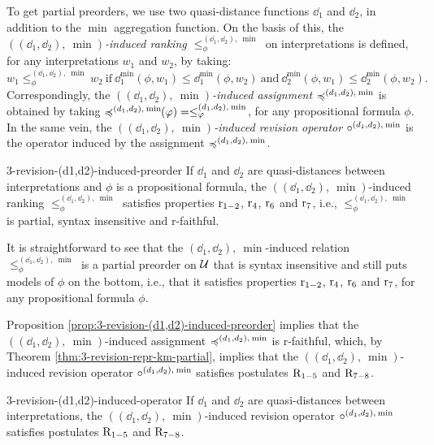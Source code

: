 To get partial preorders, we use two quasi-distance functions $\dd_{1}$ and $\dd_{2}$,
in addition to the $\min$ aggregation function.
On the basis of this, the \emph{$((\dd_{1},\dd_{2}),\:\min)$-induced ranking $\le^{(\dd_{1},\dd_{2}),\:\min}_\phi$}
on interpretations
is defined, for any interpretations $w_1$ and $w_2$, by taking:
$$
	w_1\le^{(\dd_{1},\dd_{2}),\:\min}_\phi w_2~
	\text{if}~\dd_{1}^{\min}(\phi,w_1)\le\dd_{1}^{\min}(\phi,w_2)~\text{and}~\dd_{2}^{\min}(\phi,w_1)\le\dd_{2}^{\min}(\phi,w_2).
$$
Correspondingly, 
the \emph{$((\dd_{1},\dd_{2}),\:\min)$-induced assignment $\preccurlyeq^{(d_{1},d_{2}),\:{\operatorname{min}}}$} 
is obtained by taking $\preccurlyeq^{(d_{1},d_{2}),\:{\operatorname{min}}}\!\!(\varphi)=\le_\varphi^{(d_{1},d_{2}),\:{\operatorname{min}}}$,
for any propositional formula $\phi$.
In the same vein, the 
\emph{$((\dd_{1},\dd_{2}),\:\min)$-induced revision operator $\circ^{(d_{1},d_{2}),\:{\operatorname{min}}}$} 
is the operator induced by the assignment $\preccurlyeq^{(d_{1},d_{2}),\:{\operatorname{min}}}$.

\begin{prp}{}{3-revision-(d1,d2)-induced-preorder}
	If $\dd_{1}$ and $\dd_{2}$ are quasi-distances between interpretations and 
	$\phi$ is a propositional formula, the $((\dd_{1},\dd_{2}),\:\min)$-induced 
	ranking $\le^{(\dd_{1},\dd_{2}),\:\min}_\phi$ 
	satisfies properties $\mathrm{r}_{1-2}$, $\mathrm{r}_{4}$, $\mathrm{r}_{6}$ and $\mathrm{r}_{7}$,
	i.e., $\le^{(\dd_{1},\dd_{2}),\:\min}_\phi$ is partial, syntax insensitive 
	and r-faithful.
\end{prp}
\begin{prf*}{}{}%
	It is straightforward to see that the $(\dd_{1},\dd_{2}),\:\min$-induced relation
	$\le^{(\dd_{1},\dd_{2}),\:\min}_\phi$ is 
	a partial preorder on $\mathcal{U}$ that is syntax insensitive and still puts models of $\phi$ on the bottom,
	i.e., that it satisfies properties $\mathrm{r}_{1-2}$, $\mathrm{r}_{4}$, $\mathrm{r}_{6}$ and $\mathrm{r}_{7}$, for any propositional formula $\phi$.
\end{prf*}
Proposition \ref{prop:3-revision-(d1,d2)-induced-preorder} 
implies that the $((\dd_{1},\dd_{2}),\:\min)$-induced assignment 
$\preccurlyeq^{(d_{1},d_{2}),\:{\operatorname{min}}}$ is r-faithful,
which, by Theorem \ref{thm:3-revision-repr-km-partial}, 
implies that the $((\dd_{1},\dd_{2}),\:\min)$-induced revision operator 
$\circ^{(d_{1},d_{2}),\:{\operatorname{min}}}$ satisfies postulates $\mathrm{R}_{1-5}$ and $\mathrm{R}_{7-8}$.

\begin{crl}{}{3-revision-(d1,d2)-induced-operator}
	If $\dd_{1}$ and $\dd_{2}$ are quasi-distances between interpretations, 
	the $((\dd_{1},\dd_{2}),\:\min)$-induced revision operator 
	$\circ^{(d_{1},d_{2}),\:{\operatorname{min}}}$ satisfies postulates $\mathrm{R}_{1-5}$ and $\mathrm{R}_{7-8}$.
\end{crl}

